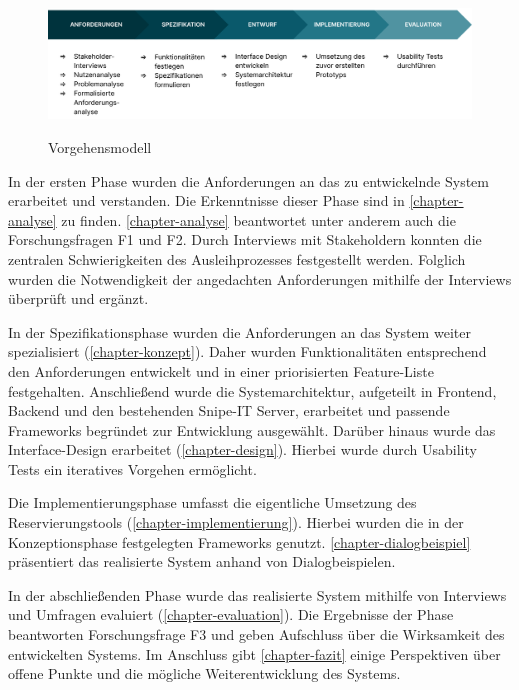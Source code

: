 \begin{figure}[h]
  \centering
  \includegraphics[scale=0.156]{Bilder/Screenshot 2022-10-17 at 18-39-40 Vorgehensmodell.pptx.png}
  \label{fig:schablone}
  \caption[Vorgehensmodell]{Vorgehensmodell}
\end{figure}

In der ersten Phase wurden die Anforderungen an das zu entwickelnde System erarbeitet und
verstanden. Die Erkenntnisse dieser Phase sind in \ref{chapter-analyse} zu finden.
\ref{chapter-analyse} beantwortet unter anderem auch die Forschungsfragen F1 und F2. Durch
Interviews mit Stakeholdern konnten die zentralen Schwierigkeiten des Ausleihprozesses
festgestellt werden. Folglich wurden die Notwendigkeit der angedachten Anforderungen mithilfe der
Interviews überprüft und ergänzt.

In der Spezifikationsphase wurden die Anforderungen an das System weiter spezialisiert
(\ref{chapter-konzept}). Daher wurden Funktionalitäten entsprechend den Anforderungen entwickelt und
in einer priorisierten Feature-Liste festgehalten. Anschließend wurde die Systemarchitektur,
aufgeteilt in Frontend, Backend und den bestehenden Snipe-IT Server, erarbeitet und passende
Frameworks begründet zur Entwicklung ausgewählt. Darüber hinaus wurde das Interface-Design
erarbeitet (\ref{chapter-design}). Hierbei wurde durch Usability Tests ein iteratives Vorgehen
ermöglicht.

Die Implementierungsphase umfasst die eigentliche Umsetzung des Reservierungstools
(\ref{chapter-implementierung}). Hierbei wurden die in der Konzeptionsphase festgelegten Frameworks
genutzt. \ref{chapter-dialogbeispiel} präsentiert das realisierte System anhand von
Dialogbeispielen.

In der abschließenden Phase wurde das realisierte System mithilfe von Interviews und Umfragen
evaluiert (\ref{chapter-evaluation}). Die Ergebnisse der Phase beantworten Forschungsfrage F3 und
geben Aufschluss über die Wirksamkeit des entwickelten Systems. Im Anschluss gibt
\ref{chapter-fazit} einige Perspektiven über offene Punkte und die mögliche Weiterentwicklung des
Systems.